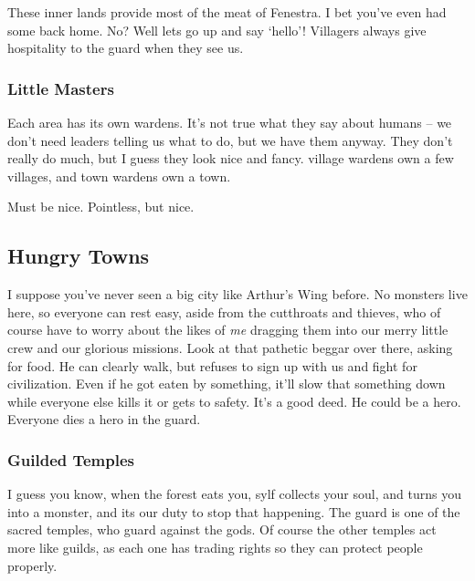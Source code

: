 \begin{multicols}{2}
\begin{exampletext}
  These inner lands provide most of the meat of Fenestra.
  I bet you've even had some back home.
  No?
  Well lets go up and say `hello'!
  Villagers always give hospitality to the \gls{guard} when they see us.

  \subsubsection*{Little Masters}

  Each area has its own \glspl{warden}.
  It's not true what they say about humans -- we don't need leaders telling us what to do, but we have them anyway.
  They don't really do much, but I guess they look nice and fancy.
  \Gls{village} \glspl{warden} own a few \glspl{village}, and town \glspl{warden} own a town.

  Must be nice.
  Pointless, but nice.
\end{exampletext}

\subsection*{Hungry Towns}

\begin{exampletext}

  I suppose you've never seen a big city like Arthur's Wing before.
  No monsters live here, so everyone can rest easy, aside from the cutthroats and thieves, who of course have to worry about the likes of \emph{me} dragging them into our merry little crew and our glorious missions.
  Look at that pathetic beggar over there, asking for food.
  He can clearly walk, but refuses to sign up with us and fight for civilization.
  Even if he got eaten by something, it'll slow that something down while everyone else kills it or gets to safety.
  It's a good deed.
  He could be a hero.
  Everyone dies a hero in the \gls{guard}.

  \subsubsection*{Guilded Temples}

  I guess you know, when the forest eats you, \gls{sylf} collects your soul, and turns you into a monster, and its our duty to stop that happening.
  The \gls{guard} is one of the sacred temples, who guard against the gods.
  Of course the other temples act more like guilds, as each one has trading rights so they can protect people properly.


\end{exampletext}
\end{multicols}
